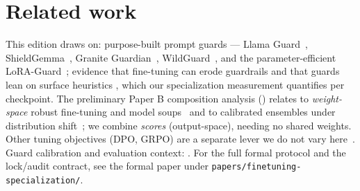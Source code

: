 \documentclass[11pt]{article}
\newcommand{\code}[1]{\texttt{\small #1}}
\begin{document}
\section*{Related work}
This edition draws on: purpose-built prompt guards --- Llama Guard~\cite{inan2023llamaguard},
ShieldGemma~\cite{zeng2024shieldgemma}, Granite Guardian~\cite{padhi2024graniteguardian},
WildGuard~\cite{han2024wildguard}, and the parameter-efficient LoRA-Guard~\cite{elesedy2024loraguard};
evidence that fine-tuning can erode guardrails and that guards lean on surface heuristics
\cite{hsiung2025guardrails,li2026surfaceheuristics,bassani2025robustness}, which our
specialization measurement quantifies per checkpoint. The preliminary Paper B composition analysis ()
relates to \emph{weight-space} robust fine-tuning and model soups~\cite{wortsman2022wiseft,wortsman2022modelsoups}
and to calibrated ensembles under distribution shift~\cite{kumar2022calibrated}; we combine
\emph{scores} (output-space), needing no shared weights. Other tuning objectives (DPO, GRPO) are
a separate lever we do not vary here~\cite{rafailov2023dpo,shao2024deepseekmath,vennemeyer2026objective}.
Guard calibration and evaluation context: \cite{guo2017calibration,liu2025calibration,bassani2024guardbench}.
For the full formal protocol and the lock/audit contract, see the formal paper under \code{papers/finetuning-specialization/}.



\end{document}
